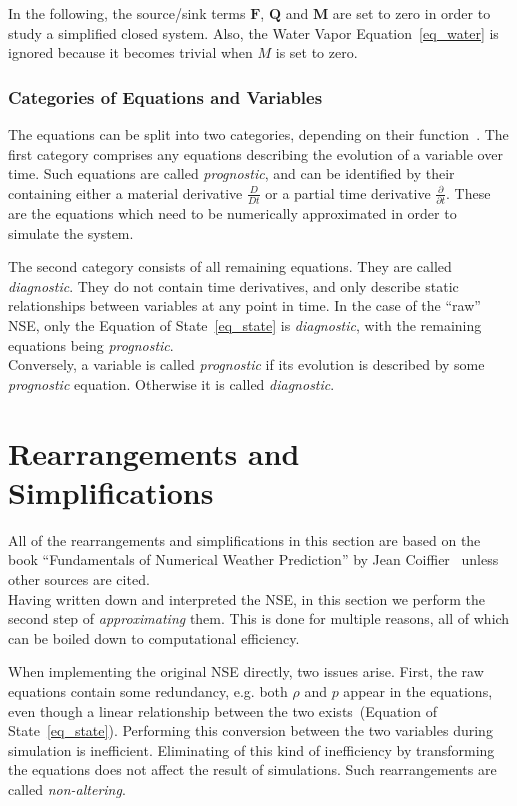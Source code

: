 \noindent
In the following, the source/sink terms $\textbf{F}$, $\textbf{Q}$ and $\textbf{M}$ are set to zero in order to study a simplified closed system.
Also, the Water Vapor Equation~\ref{eq_water} is ignored because it becomes trivial when $M$ is set to zero.

\subsubsection{Categories of Equations and Variables}
The equations can be split into two categories, depending on their function~\cite{coiffier2011fundamentals}.
The first category comprises any equations describing the evolution of a variable over time.
Such equations are called \emph{prognostic}, and can be identified by their containing either a material derivative $\frac{D}{Dt}$ or a partial time derivative $\frac{\partial}{\partial t}$.
These are the equations which need to be numerically approximated in order to simulate the system.

The second category consists of all remaining equations.
They are called \emph{diagnostic}.
They do not contain time derivatives, and only describe static relationships between variables at any point in time.
In the case of the ``raw'' NSE, only the Equation of State~\ref{eq_state} is \emph{diagnostic}, with the remaining equations being \emph{prognostic}.
\\

\noindent
Conversely, a variable is called \emph{prognostic} if its evolution is described by some \emph{prognostic} equation.
Otherwise it is called \emph{diagnostic}.


\section{Rearrangements and Simplifications}\label{sec:rearr_and_simpl}
All of the rearrangements and simplifications in this section are based on the book ``Fundamentals of Numerical Weather Prediction'' by Jean Coiffier~\cite{coiffier2011fundamentals} unless other sources are cited.
\\

\noindent
Having written down and interpreted the NSE, in this section we perform the second step of \emph{approximating} them.
This is done for multiple reasons, all of which can be boiled down to computational efficiency.

When implementing the original NSE directly, two issues arise.
First, the raw equations contain some redundancy, e.g. both $\rho$ and $p$ appear in the equations, even though a linear relationship between the two exists~(Equation of State~\ref{eq_state}).
Performing this conversion between the two variables during simulation is inefficient.
Eliminating of this kind of inefficiency by transforming the equations does not affect the result of simulations.
Such rearrangements are called \emph{non-altering}.

